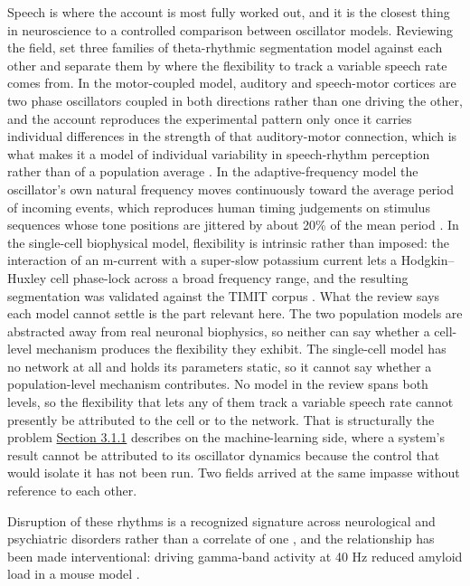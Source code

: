 \documentclass[10pt]{article}
\begin{document}
Speech is where the account is most fully worked out, and it is the
closest thing in neuroscience to a controlled comparison between
oscillator models. Reviewing the field, \citet{dogonasheva2026} set
three families of theta-rhythmic segmentation model against each other
and separate them by where the flexibility to track a variable speech
rate comes from. In the motor-coupled model, auditory and speech-motor
cortices are two phase oscillators coupled in both directions rather
than one driving the other, and the account reproduces the experimental
pattern only once it carries individual differences in the strength of
that auditory-motor connection, which is what makes it a model of
individual variability in speech-rhythm perception rather than of a
population average \citep{assaneo2020}. In the adaptive-frequency model
the oscillator's own natural frequency moves continuously toward the
average period of incoming events, which reproduces human timing
judgements on stimulus sequences whose tone positions are jittered by
about 20\% of the mean period \citep{doelling2023}. In the single-cell
biophysical model, flexibility is intrinsic rather than imposed: the
interaction of an m-current with a super-slow potassium current lets a
Hodgkin--Huxley cell phase-lock across a broad frequency range, and the
resulting segmentation was validated against the TIMIT corpus
\citep{pittman-polletta2021}. What the review says each model cannot
settle is the part relevant here. The two population models are
abstracted away from real neuronal biophysics, so neither can say
whether a cell-level mechanism produces the flexibility they exhibit.
The single-cell model has no network at all and holds its parameters
static, so it cannot say whether a population-level mechanism
contributes. No model in the review spans both levels, so the
flexibility that lets any of them track a variable speech rate cannot
presently be attributed to the cell or to the network. That is
structurally the problem \hyperref[sec-3-1-1]{Section 3.1.1} describes
on the machine-learning side, where a system's result cannot be
attributed to its oscillator dynamics because the control that would
isolate it has not been run. Two fields arrived at the same impasse
without reference to each other.

Disruption of these rhythms is a recognized signature across
neurological and psychiatric disorders rather than a correlate of one
\citep{uhlhaas2006}, and the relationship has been made interventional:
driving gamma-band activity at 40 Hz reduced amyloid load in a mouse
model \citep{iaccarino2016}.
\end{document}
